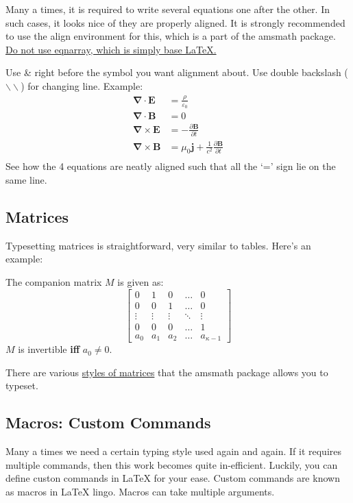 \documentclass[12pt, letterpaper]{article}
\theoremstyle{remark}
\begin{document}
    Many a times, it is required to write several equations one after the other.
    In such cases, it looks nice of they are properly aligned. It is strongly recommended to use the align environment for this,
    which is a part of the amsmath package. \href{https://tex.stackexchange.com/questions/196/eqnarray-vs-align}{Do not use eqnarray, which is simply base \LaTeX.}

    Use \& right before the symbol you want alignment about. Use double backslash ($\backslash \backslash$) for changing line.
    Example: 
    \begin{align*}
        \boldsymbol{\nabla} \cdot \mathbf{E} &= \frac{\rho}{\varepsilon_0} \\
        \boldsymbol{\nabla} \cdot \mathbf{B} &= 0 \\
        \boldsymbol{\nabla} \times \mathbf{E} &= -\frac{\partial \mathbf{B}}{\partial t} \\
        \boldsymbol{\nabla} \times \mathbf{B} &= \mu_0\mathbf{j} + \frac{1}{c^2}\frac{\partial \mathbf{B}}{\partial t} \\
    \end{align*}
    See how the 4 equations are neatly aligned such that all the `=' sign lie on the same line.

    \subsection{Matrices}
    Typesetting matrices is straightforward, very similar to tables. Here's an example:

    The companion matrix $M$ is given as: \\
    $$\begin{bmatrix}
        0 & 1 & 0 & \dots & 0 \\
        0 & 0 & 1 & \dots & 0 \\
        \vdots & \vdots & \vdots & \ddots & \vdots \\
        0 & 0 & 0 & \dots & 1 \\
        a_0 & a_1 & a_2 & \dots & a_{\kappa-1}
    \end{bmatrix}$$
    $M$ is invertible \textbf{iff} $a_0 \neq 0$.

    There are various \href{https://www.overleaf.com/learn/latex/Matrices}{styles of matrices} that the amsmath package allows you to typeset.

\clearpage

    \subsection{Macros: Custom Commands}
    Many a times we need a certain typing style used again and again. If it requires multiple commands, then this work
    becomes quite in-efficient. Luckily, you can define custon commands in \LaTeX{} for your ease. Custom commands are known as macros in \LaTeX{} lingo.
    Macros can take multiple arguments.
\end{document}
